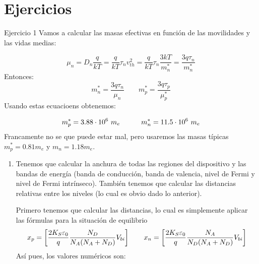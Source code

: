 \section{Ejercicios}


\tcbstartrecording

\begin{texercise}
    Ejercicio 1
    \tcblower
    Vamos a calcular las masas efectivas en función de las movilidades y las vidas medias:

    \begin{equation}
        \mu_n = D_n \frac{q}{kT} = \frac{q}{kT} \tau_n v^2_{th} = \frac{q}{kT} \tau_n \frac{3kT}{m_n^*} = \frac{3q\tau_n}{m_n^*}
    \end{equation}
    Entonces:
    \begin{equation}
        m_n^* = \frac{3q\tau_n}{\mu_n} \qquad m_p^* = \frac{3q\tau_p}{\mu_p^*}
    \end{equation}
    Usando estas ecuacioens obtenemos:

    \begin{equation}
        m_p^* = 3.88 \cdot 10^6 \ m_e \quad \quad \quad m_n^* = 11.5 \cdot 10^6 \ m_e
    \end{equation}
    Francamente no se que puede estar mal, pero usaremos las masas típicas $m_p^* = 0.81m_e$ y $m_n=1.18 m_e$. 
    \begin{enumerate}[label=\alph*)]
        \item Tenemos que calcular la anchura de todas las regiones del dispositivo y las bandas de energía (banda de conducción, banda de valencia, nivel de Fermi y nivel de Fermi intrínseco). También tenemos que calcular las distancias relativas entre los niveles (lo cual es obvio dado lo anterior). 
        
        Primero tenemos que calcular las distancias, lo cual es simplemente aplicar las fórmulas para la situación de equilibrio
        \begin{equation}
            x_p = \left[ \frac{2K_S\varepsilon_0}{q} \frac{N_D}{N_A(N_A+N_D)}  V_{bi} \right]   \qquad 
            x_n = \left[ \frac{2K_S\varepsilon_0}{q} \frac{N_A}{N_D(N_A+N_D)}  V_{bi} \right]
        \end{equation}
        Así pues, los valores numéricos son: 


\end{enumerate}
\end{texercise}

